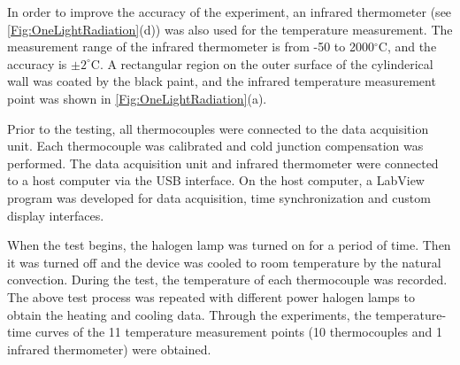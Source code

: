 In order to improve the accuracy of the experiment, an infrared thermometer (see \ref{Fig:OneLightRadiation}(d)) was also used for the temperature measurement.
The measurement range of the infrared thermometer is from -50 to 2000$^{\circ}$C, and the accuracy is $\pm2^{\circ}$C.
A rectangular region on the outer surface of the cylinderical wall was coated by the black paint, and the infrared temperature measurement point was shown in \ref{Fig:OneLightRadiation}(a).

Prior to the testing, all thermocouples were connected to the data acquisition unit. Each thermocouple was calibrated and cold junction compensation was performed.
The data acquisition unit and infrared thermometer were connected to a host computer via the USB interface.
On the host computer, a LabView program was developed for data acquisition, time synchronization and custom display interfaces.

When the test begins, the halogen lamp was turned on for a period of time. Then it was turned off and the device was cooled to room temperature by the natural convection.
During the test, the temperature of each thermocouple was recorded.
The above test process was repeated with different power halogen lamps to obtain the heating and cooling data.
Through the experiments, the temperature-time curves of the 11 temperature measurement points (10 thermocouples and 1 infrared thermometer) were obtained.



